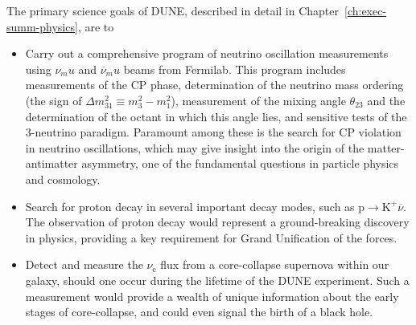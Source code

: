 
The primary science goals of DUNE, described in detail in Chapter~\ref{ch:exec-summ-physics}, are to
\begin{itemize}

\item Carry out a comprehensive program of neutrino oscillation measurements using $\nu_mu$ and ${\overline \nu_mu}$ beams from Fermilab. This program includes measurements of the CP phase, determination of the neutrino mass ordering (the sign of $\Delta m^2_{31} \equiv m_3^2-m_1^2$), measurement of the mixing angle $\theta_{23}$ and the determination of the octant in which this angle lies,
and sensitive tests of the 3-neutrino paradigm. Paramount among these is the search for CP violation in neutrino oscillations, which may give insight into the origin of the matter-antimatter asymmetry, one of the fundamental questions in particle physics and cosmology. 

\item Search for proton decay in several important decay modes, such as $\text{p}\rightarrow\text{K}^+\overline{\nu}$. The observation of proton decay would represent a ground-breaking discovery in physics, providing a key requirement for Grand Unification of the forces. 

    \item Detect and measure the $\nu_\text{e}$ flux from a core-collapse supernova within our galaxy, should one occur during the lifetime of the DUNE experiment. Such a measurement would provide a wealth of unique information about the early stages of core-collapse, and could even signal the birth of a black hole.
    
\end{itemize}

